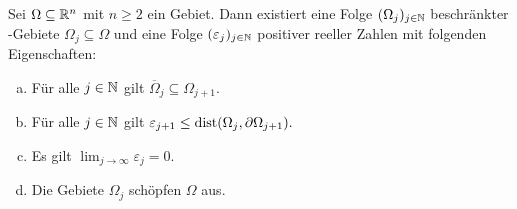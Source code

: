\begin{lem}
  \label{lem:lipschitzExhaust}
  Sei $\Omega \subseteq \mathbb{R}^n$ mit $n \geq 2$ ein Gebiet.
  Dann existiert eine Folge $(\Omega_j)_{j \in \mathbb{N}}$ beschränkter \lipschitz\hyp{}Gebiete $\Omega_j \subseteq \Omega$ und eine Folge $(\varepsilon_j)_{j \in \mathbb{N}}$ positiver reeller Zahlen mit folgenden Eigenschaften:
  \begin{enumerate}[a)]
    \item Für alle $j \in \mathbb{N}$ gilt $\overline{\Omega}_j \subseteq \Omega_{j + 1}$.
    \item Für alle $j \in \mathbb{N}$ gilt $\varepsilon_{j + 1} \leq \operatorname{dist}(\Omega_j, \partial \Omega_{j + 1}).$
    \item Es gilt $\lim_{j \to \infty} \varepsilon_j = 0$.
    \item Die Gebiete $\Omega_j$ schöpfen $\Omega$ aus.
  \end{enumerate}
\end{lem}

